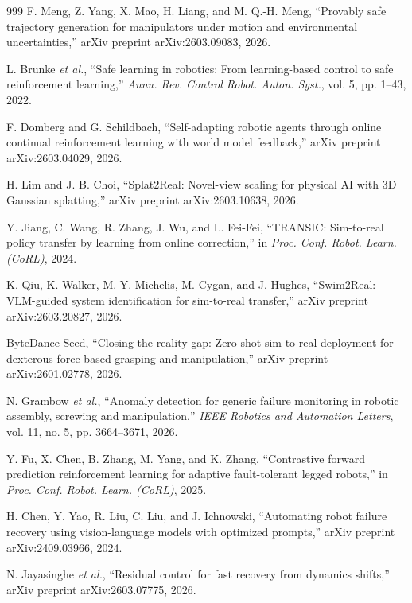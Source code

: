 \documentclass[12pt,a4paper,oneside]{report}
\begin{document}
\begin{thebibliography}{999}
F. Meng, Z. Yang, X. Mao, H. Liang, and M. Q.-H. Meng, ``Provably safe trajectory generation for manipulators under motion and environmental uncertainties,'' arXiv preprint arXiv:2603.09083, 2026.

L. Brunke \textit{et al.}, ``Safe learning in robotics: From learning-based control to safe reinforcement learning,'' \textit{Annu. Rev. Control Robot. Auton. Syst.}, vol. 5, pp. 1--43, 2022.

F. Domberg and G. Schildbach, ``Self-adapting robotic agents through online continual reinforcement learning with world model feedback,'' arXiv preprint arXiv:2603.04029, 2026.

H. Lim and J. B. Choi, ``Splat2Real: Novel-view scaling for physical {AI} with {3D} Gaussian splatting,'' arXiv preprint arXiv:2603.10638, 2026.

Y. Jiang, C. Wang, R. Zhang, J. Wu, and L. Fei-Fei, ``{TRANSIC}: Sim-to-real policy transfer by learning from online correction,'' in \textit{Proc. Conf. Robot. Learn. (CoRL)}, 2024.

K. Qiu, K. Walker, M. Y. Michelis, M. Cygan, and J. Hughes, ``Swim2Real: VLM-guided system identification for sim-to-real transfer,'' arXiv preprint arXiv:2603.20827, 2026.

ByteDance Seed, ``Closing the reality gap: Zero-shot sim-to-real deployment for dexterous force-based grasping and manipulation,'' arXiv preprint arXiv:2601.02778, 2026.

N. Grambow \textit{et al.}, ``Anomaly detection for generic failure monitoring in robotic assembly, screwing and manipulation,'' \textit{IEEE Robotics and Automation Letters}, vol. 11, no. 5, pp. 3664--3671, 2026.

Y. Fu, X. Chen, B. Zhang, M. Yang, and K. Zhang, ``Contrastive forward prediction reinforcement learning for adaptive fault-tolerant legged robots,'' in \textit{Proc. Conf. Robot. Learn. (CoRL)}, 2025.

H. Chen, Y. Yao, R. Liu, C. Liu, and J. Ichnowski, ``Automating robot failure recovery using vision-language models with optimized prompts,'' arXiv preprint arXiv:2409.03966, 2024.

N. Jayasinghe \textit{et al.}, ``Residual control for fast recovery from dynamics shifts,'' arXiv preprint arXiv:2603.07775, 2026.


\end{thebibliography}
\end{document}
